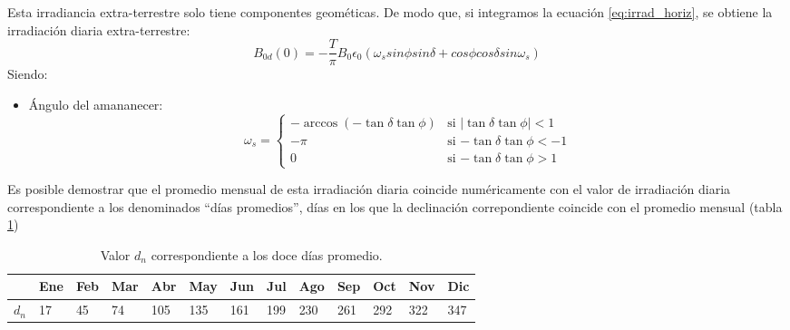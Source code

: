Esta irradiancia extra-terrestre solo tiene componentes geométicas. De modo que, si integramos la ecuación \ref{eq:irrad_horiz}, se obtiene la irradiación diaria extra-terrestre:
\begin{equation}
B_{0d}(0)=-\frac{T}{\pi}B_0\epsilon_0(\omega_s sin\phi sin\delta + cos\phi cos\delta sin \omega_s)
\label{eq:irrad_dia}
\end{equation}
Siendo:
\begin{itemize}
\item Ángulo del amananecer: 
\[
  \omega_s=\begin{cases}
  -\arccos(-\tan\delta\tan\phi)& \text{si $|\tan\delta\tan\phi|<1$}\\
  -\pi& \text{si $-\tan\delta\tan\phi<-1$}\\
  0& \text{si $-\tan\delta\tan\phi>1$}
  \end{cases}\]
\end{itemize}

Es posible demostrar que el promedio mensual de esta irradiación diaria coincide numéricamente con el valor de irradiación diaria correspondiente a los denominados ``días promedios'', días en los que la declinación correpondiente coincide con el promedio mensual (tabla \ref{tab:DiasPromedio})
\begin{center}
{\footnotesize }%
\begin{table}[h]
{\footnotesize \caption{Valor $d_{n}$ correspondiente a los doce días promedio.\label{tab:DiasPromedio}}
}{\footnotesize \par}

\centering{}{\footnotesize }\begin{tabular}{>{\centering}p{6mm}>{\centering}m{4mm}>{\centering}m{4mm}>{\centering}m{4mm}>{\centering}m{4mm}>{\centering}m{4mm}>{\centering}m{4mm}>{\centering}m{4mm}>{\centering}m{4mm}>{\centering}m{4mm}>{\centering}m{4mm}>{\centering}m{4mm}>{\centering}m{3mm}}
\toprule 
{\footnotesize Mes} & {\footnotesize Ene} & {\footnotesize Feb} & {\footnotesize Mar} & {\footnotesize Abr} & {\footnotesize May} & {\footnotesize Jun} & {\footnotesize Jul} & {\footnotesize Ago} & {\footnotesize Sep} & {\footnotesize Oct} & {\footnotesize Nov} & {\footnotesize Dic}\tabularnewline
\midrule
$d_{n}$ & {\footnotesize 17} & {\footnotesize 45} & {\footnotesize 74} & {\footnotesize 105} & {\footnotesize 135} & {\footnotesize 161} & {\footnotesize 199} & {\footnotesize 230} & {\footnotesize 261} & {\footnotesize 292} & {\footnotesize 322} & {\footnotesize 347}\tabularnewline
\bottomrule
\end{tabular}
\end{table}

\par\end{center}{\footnotesize \par}

